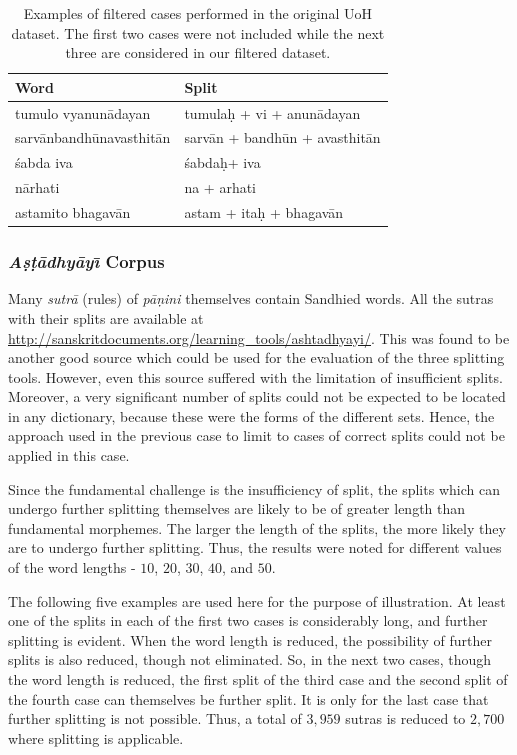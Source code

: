 \documentclass[11pt]{article}
\begin{document}
\begin{table}[h]
	\begin{center}
		\begin{tabular}{|l|p{3cm}|}
			\hline 
			\bf Word & \bf Split \\
			\hline
			tumulo vyanun\={a}dayan &	tumula\d{h} + vi + anun\={a}dayan \\ \hline
			sarv\={a}nbandh\={u}navasthit\={a}n & sarv\={a}n + bandh\={u}n + avasthit\={a}n\\ \hline
			\'{s}abda iva & \'{s}abda\d{h}+  iva\\ \hline
			n\={a}rhati & na + arhati\\ \hline
			astamito bhagav\={a}n & astam + ita\d{h} + bhagav\={a}n \\ \hline
		\end{tabular}
	\end{center}
	\caption{\label{extable} Examples of filtered cases performed in the original UoH dataset. The first two cases were not included while the next three are considered in our filtered dataset.}
\end{table}

\subsubsection{\textit{A\d{s}\d{t}\={a}dhy\={a}y\={\i}} Corpus}
Many \textit{sutr\={a}} (rules) of \textit{p\={a}\d{n}ini} themselves contain Sandhied words. All the sutras with their splits are available at \url{http://sanskritdocuments.org/learning_tools/ashtadhyayi/}. This was found to be another good source which could be used for the evaluation of the three splitting tools.  However, even this source suffered with the limitation of insufficient splits. Moreover, a very significant number of splits could not be expected to be located in any dictionary, because these were the forms of the different sets. Hence, the approach used in the previous case to limit to cases of correct splits could not be applied in this case.

Since the fundamental challenge is the insufficiency of split, the splits which can undergo further splitting themselves are likely to be of greater length than fundamental morphemes. The larger the length of the splits, the more likely they are to undergo further splitting. Thus, the results were noted for different values of the word lengths - $10$, $20$, $30$, $40$, and $50$.

The following five examples are used here for the purpose of illustration. At least one of the splits in each of the first two cases is considerably long, and further splitting is evident.  When the word length is reduced, the possibility of further splits is also reduced, though not eliminated. So, in the next two cases, though the word length is reduced, the first split of the third case and the second split of the fourth case can themselves be further split. It is only for the last case that further splitting is not possible. Thus, a total of $3,959$ sutras is reduced to $2,700$ where splitting is applicable.
\end{document}
